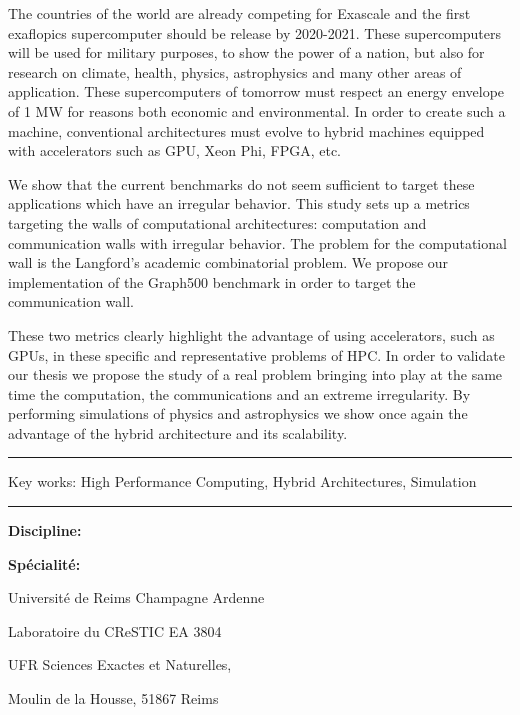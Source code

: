 The countries of the world are already competing for Exascale and the first exaflopics supercomputer should be release by 2020-2021.
These supercomputers will be used for military purposes, to show the power of a nation, but also for research on climate, health, physics, astrophysics and many other areas of application.
These supercomputers of tomorrow must respect an energy envelope of 1 MW for reasons both economic and environmental.
In order to create such a machine, conventional architectures must evolve to hybrid machines equipped with accelerators such as GPU, Xeon Phi, FPGA, etc.

We show that the current benchmarks do not seem sufficient to target these applications which have an irregular behavior.
This study sets up a metrics targeting the walls of computational architectures: computation and communication walls with irregular behavior.
The problem for the computational wall is the Langford's academic combinatorial problem.
We propose our implementation of the Graph500 benchmark in order to target the communication wall.

These two metrics clearly highlight the advantage of using accelerators, such as GPUs, in these specific and representative problems of HPC.
In order to validate our thesis we propose the study of a real problem bringing into play at the same time the computation, the communications and an extreme irregularity.
By performing simulations of physics and astrophysics we show once again the advantage of the hybrid architecture and its scalability.

\vspace{.5cm}
\hrule
\vspace{.2cm}

{
\small
Key works: High Performance Computing, Hybrid Architectures, Simulation
}

\vspace{.1cm}
\hrule

\vspace{.5cm}
\textbf{Discipline: \phdDiscipline}

\textbf{Spécialité: \phdSpeciality}
\vspace{.2cm}

\hspace{10cm}Université de Reims Champagne Ardenne

\hspace{10cm}Laboratoire du CReSTIC EA 3804

\hspace{10cm}UFR Sciences Exactes et Naturelles, 

\hspace{10cm}Moulin de la Housse, 51867 Reims

